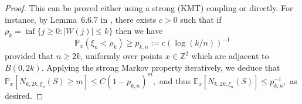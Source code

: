 \documentclass[11pt]{article}
\def\P{{\mathbb P}}
\def\Z{{\mathbb Z}}
\begin{document}
\begin{proof} 
This can be proved either using a strong (KMT) coupling or directly. For instance, by Lemma~6.6.7 in \cite{LawlerLimic}, there exists $c>0$ such that if $\rho_k = \inf \{j\ge 0:| W(j) |\le k \}$ then we have 
$$
\P_x ( \xi_n < \rho_k) \ge p_{k,n}:=c (\log (k/n))^{-1}
$$
provided that $n\ge 2k$, uniformly over points $x\in \Z^2$ which are adjacent to $B(0,2k)$. Applying the strong Markov property iteratively, we deduce that 
$\mathbb{P}_x[ N_{k,2k,\xi_n}(S) \ge m  ] \leq C (1-p_{k,n})^m,$ and thus $ \mathbb{E}_x[ N_{k,2k,\xi_n}(S)]\le p_{k,n}^{-1},$ as desired.
%
%
%
%
%
%
%

\end{proof}
\end{document}

